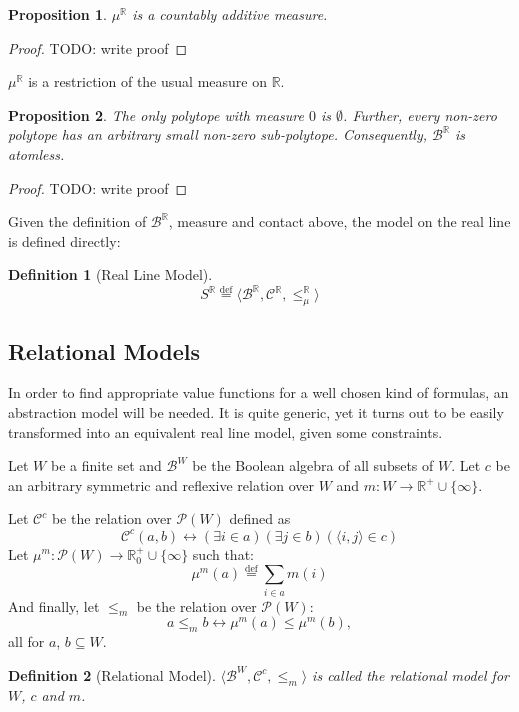 \documentclass{article}
\newtheorem*{definition}{Definition}
\newtheorem*{proposition}{Proposition}
\newcommand{\R}{\mathbb{R}}
\newcommand{\pwrset}{\mathcal{P}}
\newcommand{\B}{\mathcal{B}}
\newcommand{\bcont}{\mathcal{C}^\R}
\newcommand{\bmeasure}{\leq_\mu^\R}
\newcommand{\eqdef}{\stackrel{\text{def}}{=}}
\begin{document}
\begin{proposition}
  $\mu^\R$ is a countably additive measure.
\end{proposition}
\begin{proof}
  TODO: write proof
\end{proof}

$\mu^\R$ is a restriction of the usual measure on $\R$.

\begin{proposition}
The only polytope with measure $0$ is $\emptyset$. Further, every non-zero polytope has an arbitrary small non-zero sub-polytope. Consequently, $\B^\R$ is atomless.
\end{proposition}
\begin{proof}
  TODO: write proof
\end{proof}

Given the definition of $\B^\R$, measure and contact above, the model on the real line is defined directly:

\begin{definition}[Real Line Model]
  \begin{equation*}
    S^\R \eqdef \langle \B^\R, \bcont, \bmeasure \rangle
  \end{equation*}
\end{definition}

\subsection{Relational Models}
In order to find appropriate value functions for a well chosen kind of formulas, an abstraction model will be needed. It is quite generic, yet it turns out to be easily transformed into an equivalent real line model, given some constraints.

Let $W$ be a finite set and $\B^W$ be the Boolean algebra of all subsets of $W$. Let $c$ be an arbitrary symmetric and reflexive relation over $W$ and $m: W \rightarrow \R^+ \cup \{\infty\}$.

Let $\mathcal{C}^c$ be the relation over $\pwrset(W)$ defined as
\begin{equation*}
  \mathcal{C}^c(a, b) \leftrightarrow (\exists i \in a)(\exists j \in b)(\langle i, j \rangle \in c)
\end{equation*}
Let $\mu^m: \pwrset(W) \rightarrow \R_0^+ \cup \{\infty\}$ such that:
\begin{equation*}
  \mu^m(a) \eqdef \sum_{i \in a}m(i)
\end{equation*}
And finally, let $\leq_m$ be the relation over $\pwrset(W)$:
\begin{equation*}
  a \leq_m b \leftrightarrow \mu^m(a) \leq \mu^m(b),
\end{equation*}
all for $a$, $b \subseteq W$.
\begin{definition}[Relational Model]
$\langle \B^W, \mathcal{C}^c, \leq_m \rangle$ is called the \emph{relational model for $W$, $c$ and $m$}.
\end{definition}
\end{document}
